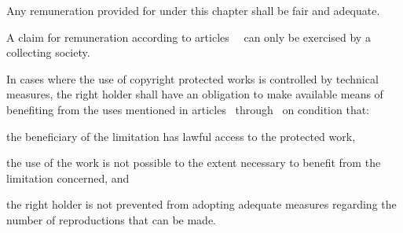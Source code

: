 \begin{contract}
\label{Par:AmountAndCollectionOfRemuneration}
\Sentence Any remuneration provided for under this chapter shall be fair and
adequate.

\Sentence A claim for remuneration according to articles~~ %
can only be exercised by a collecting society.

\label{Par:LimitationsPrevailingOverTechnicalMeasures}
\Sentence In cases where the use of copyright protected works is controlled by technical
measures, the right holder shall have an obligation to make available means
of benefiting from the uses mentioned in articles~ through~ 
on condition that:
\begin{legalenum}
	\item the beneficiary of the limitation has lawful access to the protected work,
	\item the use of the work is not possible to the extent necessary to benefit from
				the limitation concerned, and
	\item the right holder is not prevented from adopting adequate measures
				regarding the number of reproductions that can be made.
\end{legalenum}


\end{contract}